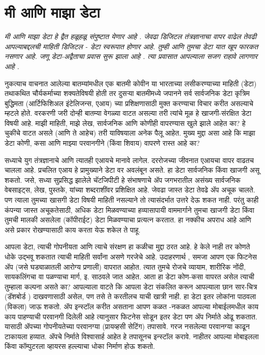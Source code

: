 \chapter{मी आणि माझा डेटा}

{\textit{मी आणि माझा डेटा हे द्वैत हळूहळू संपुष्टात येणार आहे .  जेवढा डिजिटल तंत्रज्ञानाचा वापर वाढेल तेवढी आपल्याबद्दलची माहिती डिजिटल - डेटा स्वरूपात होणार आहे. तुम्ही आणि तुमचा डेटा  यात खूप फारकत नसणार आहे. जणू डेटा-अद्वैताचा प्रवास सुरू झाला आहे .  त्या प्रवासात आपल्याला सजग राहावे लागणार आहे . }}

\vspace{1.5em}

नुकत्याच वाचनात आलेल्या बातम्यांमधील एक बातमी कोवीन या भारताच्या लसीकरण्याच्या माहिती (डेटा) तथाकथित चौर्यकर्माच्या शक्यतेविषयी होती तर दुसऱ्या बातमीमध्ये जपानने सर्व सार्वजनिक डेटा कृत्रिम बुद्धिमता (आर्टिफिशिअल इंटेलिजन्स, एआय) च्या प्रशिक्षणासाठी मुक्त करण्याचा विचार करीत असल्याचे म्हटले होते. वरकरणी जरी दोन्ही बातम्या वेगळ्या वाटत असल्या तरी त्यांचे मूळ हे खाजगी-संरक्षित डेटा विषयी आहे. माझी माहिती, माझे लेख, सार्वजनिक आणि कोणीही वापरण्यास खुले झाले आहेत का? हे चुकीचे वाटत असले (आणि ते आहेच) तरी याविषयाला अनेक पैलू आहेत. मुख्य मुद्दा असा आहे कि माझा डेटा कोणी, कसा आणि माझ्या परवानगीने (किंवा शिवाय) वापरणे रास्त आहे का?

सध्याचे युग तंत्रज्ञानाचे आणि त्यातही एआयचे मानावे लागेल. दररोजच्या जीवनात एआयचा वापर वाढतच चालला आहे. प्रचलित एआय हे प्रामुख्याने डेटा वर अवलंबून असते. हा डेटा सार्वजनिक किंवा खाजगी असू शकतो. जसे, सध्या सुप्रसिद्ध झालेले चॅटजिपीटी हे संभाषणाचे ॲप जगभरातील असंख्य सार्वजनिक वेबसाइट्स, लेख, पुस्तके, यांच्या शब्दराशींवर प्रशिक्षित आहे. जेवढा जास्त डेटा तेवढे ॲप अचूक चालते. पण त्याला तुमच्या खासगी डेटा विषयी माहिती नसल्याने तो त्यासंदर्भात उत्तरे देऊ शकत नाही. परंतु काही कंपन्या जास्त अचूकतेसाठी, अधिक डेटा मिळवण्याच्या हव्यासापायी वाममार्गाने तुमचा खाजगी डेटा किंवा तुमची मालकी असलेला (कॉपीराईट) डेटा मिळवण्याचा प्रत्यत्न करतात. हा नक्कीच अपराध आहे आणि असे प्रकार रोखण्यासाठी काय करता येऊ शकेल ते पाहू.

आपला डेटा, त्याची गोपनीयता आणि त्याचे संरक्षण हा कळीचा मुद्दा ठरत आहे. हे केले नाही तर कोणते धोके उद्भवू शकतात त्याची माहिती सर्वांना असणे गरजेचे आहे. उदाहरणार्थ , समजा आपण एक फिटनेस ॲप (जसे घड्याळातली आरोग्य प्रणाली) वापरात आहोत. त्यात तुमचे रोजचे व्यायाम, शारीरिक नोंदी, सायकलिंगचा वा पळण्याचा मार्ग, इ. साठवले जात आहेत. आता हा डेटा कोण-कसा वापरत असेल त्याची तुम्हाला कल्पना असते का? आपल्याला वाटते कि आपला डेटा संकलित करून आपल्याला छान सार-चित्र (डॅशबोर्ड ) दाखवणासाठी असेल, पण तसे ते करतीलच याची खात्री नाही. हा डेटा इतर लोकांना पाठवला (विकला) जाऊ शकतो. ॲप इन्स्टॉल करीत असताना आपण कळत -नकळत आपल्या मोबाईलमधील काय काय पाहण्याची परवानगी दिलेली आहे त्यानुसार फिटनेस सोडून इतर डेटा पण ॲप निर्माते ओढू शकतात. यासाठी ॲपच्या गोपनीयतेच्या परवानग्या (प्रायव्हसी सेटिंग) तपासावे. गरज नसलेल्या परवानग्या काढून टाकायला हव्यात. ॲपचे निर्माते विश्वासार्ह आहेत हे तपासूनच इन्स्टॉल करावे. नाहीतर आपल्या मोबाइलला किंवा कॉम्पुटरला व्हायरस हल्ल्याचा धोका निर्माण होऊ शकतो.

